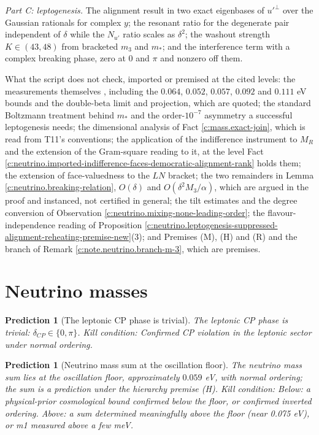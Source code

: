 \documentclass[11pt]{article}
\newtheorem{prediction}[theorem]{Prediction}
\theoremstyle{definition}
\theoremstyle{plain}
\begin{document}
\emph{Part C: leptogenesis.} The alignment result in two exact eigenbases of $u'^{\perp}$ over the Gaussian rationals for complex $y$; the resonant ratio for the degenerate pair independent of $\delta$ while the $N_{u'}$ ratio scales as $\delta^{2}$; the washout strength $K \in (43, 48)$ from bracketed $m_{3}$ and $m_{*}$; and the interference term with a complex breaking phase, zero at $0$ and $\pi$ and nonzero off them.

What the script does not check, imported or premised at the cited levels: the measurements themselves \cite{PDG2024, NuFIT2024, DESI2025, HouWangZhaoZhang2026, T2KNOvA2025, KamLANDZen2023, LEGEND2021}, including the $0.064$, $0.052$, $0.057$, $0.092$ and $0.111$ eV bounds and the double-beta limit and projection, which are quoted; the standard Boltzmann treatment behind $m_{*}$ and the order-$10^{-7}$ asymmetry a successful leptogenesis needs; the dimensional analysis of Fact \ref{c:mass.exact-join}, which is read from T11's conventions; the application of the indifference instrument to $M_{R}$ and the extension of the Gram-square reading to it, at the level Fact \ref{c:neutrino.imported-indifference-faces-democratic-alignment-rank} holds them; the extension of face-valuedness to the $LN$ bracket; the two remainders in Lemma \ref{c:neutrino.breaking-relation}, $O(\delta)$ and $O(\delta^{2}M_{3}/\alpha)$, which are argued in the proof and instanced, not certified in general; the tilt estimates and the degree conversion of Observation \ref{c:neutrino.mixing-none-leading-order}; the flavour-independence reading of Proposition \ref{c:neutrino.leptogenesis-suppressed-alignment-reheating-premise-new}(3); and Premises (M), (H) and (R) and the branch of Remark \ref{c:note.neutrino.branch-m-3}, which are premises.

\section{Neutrino masses}

\begin{prediction}[The leptonic CP phase is trivial]\label{c:pred.leptonic-cp-trivial}
The leptonic CP phase is trivial: $\delta_{CP} \in \{0, \pi\}$.
\emph{Kill condition:} Confirmed CP violation in the leptonic sector under normal ordering.
\end{prediction}

\begin{prediction}[Neutrino mass sum at the oscillation floor]\label{c:pred.neutrino-mass-sum-floor}
The neutrino mass sum lies at the oscillation floor, approximately $0.059$ eV, with normal ordering; the sum is a prediction under the hierarchy premise (H).
\emph{Kill condition:} Below: a physical-prior cosmological bound confirmed below the floor, or confirmed inverted ordering. Above: a sum determined meaningfully above the floor (near 0.075 eV), or m1 measured above a few meV.
\end{prediction}
\end{document}
